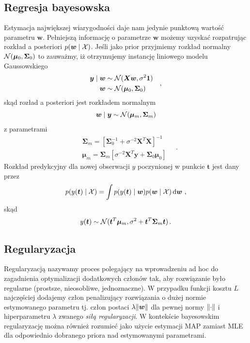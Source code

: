 \documentclass{myclass}
\numberwithin{equation}{subsection}
\begin{document}
\subsection{Regresja bayesowska}

Estymacja największej wiarygodności daje nam jedynie punktową wartość parametru \(\bm{w}\).
Pełniejszą informację o parametrze \(\mathbf{w}\) możemy uzyskać rozpatrując rozkład a posteriori
\(p(\bm{w} \mid \mathcal{X})\). Jeśli jako prior przyjmiemy rozkład normalny \(\mathcal{N}(\bm{\mu}_0,
\bm{\Sigma}_0)\) to zauważmy, iż otrzymujemy instancję liniowego modelu Gaussowskiego
\[
\begin{split}
\bm{y} \mid \bm{w} &\sim \mathcal{N}(\bm{X}\bm{w}, \sigma^2\bm{1})\\
            \bm{w} &\sim \mathcal{N}(\bm{\mu}_0, \bm{\Sigma}_0) 
\end{split}\quad,
\]
skąd rozład a posteriori jest rozkładem normalnym
\[
\bm{w} \mid \bm{y} \sim \mathcal{N}(\bm{\mu}_m, \bm{\Sigma}_m)
\]
z parametrami
\[
\begin{split}
&\bm{\Sigma}_m = \left[\bm{\Sigma}_0^{-1} + \sigma^{-2}\bm{X}^T\bm{X}\right]^{-1}\\
&\bm{\mu}_m    = \bm{\Sigma}_m \left[\sigma^{-2}\bm{X}^T\bm{y} + \bm{\Sigma}_0\bm{\mu}_0\right]
\end{split}\quad.
\]
Rozkład predykcyjny dla nowej obserwacji \(y\) poczynionej w punkcie \(\bm{t}\) jest dany przez
\[
p(y(\bm{t}) \mid \mathcal{X}) = \int p(y(\bm{t}) \mid \bm{w}) p(\bm{w} \mid \mathcal{X}) \dd{\bm{w}}\,,
\]
skąd
\[
y(\bm{t}) \sim \mathcal{N}(\bm{t}^T\bm{\mu}_m, \sigma^2 + \bm{t}^T\bm{\Sigma}_m\bm{t})\,.
\]


\subsection{Regularyzacja}

Regularyzacją  nazywamy proces polegający na wprowadzeniu ad hoc do zagadnienia optymalizacji
dodatkowych członów tak, aby rozwiązanie było regularne (prostsze, nieosobliwe, jednoznaczne). W
przypadku funkcji kosztu \(L\) najczęściej dodajemy człon penalizujący rozwiązania o dużej normie
estymowanego parametru tj. człon postaci \(\lambda \norm{\bm{w}}\) dla pewnej normy \(\norm{\cdot}\)
i hiperparametru \(\lambda\) zwanego \emph{siłą regularyzacji}. W kontekście bayesowskim
regularyzację można również rozumieć jako użycie estymacji MAP zamiast MLE dla odpowiednio dobranego
priora nad estymowanymi parametrami.
\end{document}
